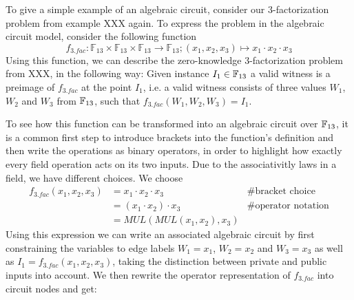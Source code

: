 \begin{example} To give a simple example of an algebraic circuit, consider our $3$-factorization problem from example XXX again.  To express the problem in the algebraic circuit model, consider the following function 
\[
f_{3.fac}:\mathbb{F}_{13}\times\mathbb{F}_{13}\times\mathbb{F}_{13}\to\mathbb{F}_{13};(x_{1},x_{2},x_{3})\mapsto x_{1}\cdot x_{2}\cdot x_{3}
\]
Using this function, we can describe the zero-knowledge $3$-factorization problem from XXX, in the following way: Given instance $I_1\in \mathbb{F}_{13}$ a valid witness is a preimage of $f_{3.fac}$ at the point $I_1$, i.e. a valid witness consists of three values $W_1$, $W_2$ and $W_3$ from $\mathbb{F}_{13}$, such that $f_{3.fac}(W_1,W_2,W_3)=I_1$. 

To see how this function can be transformed into an algebraic circuit over $\mathbb{F}_{13}$, it is a common first step to introduce brackets into the function's definition and then write the operations as binary operators, in order to highlight how exactly every field operation acts on its two inputs. Due to the associativitly laws in a field, we have different choices. We choose
\begin{align*}
f_{3.fac}(x_1,x_2,x_3) & = x_1\cdot x_2 \cdot x_3  & \text{\# bracket choice} \\
                       & = (x_1\cdot x_2 ) \cdot x_3  & \text{\# operator notation} \\
                       & = MUL(MUL(x_1,x_2),x_3)
\end{align*}
Using this expression we can write an associated algebraic circuit by first constraining the variables to edge labels $W_1=x_1$, $W_2=x_2$ and $W_3=x_3$ as well as $I_1=f_{3.fac}(x_1,x_2,x_3)$, taking the distinction between private and public inputs into account. We then rewrite the operator representation of $f_{3.fac}$ into circuit nodes and get: 
\begin{center}
\end{center}



\end{example}
